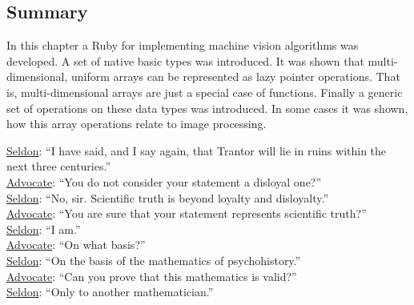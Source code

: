 \documentclass[12pt,a4paper,oneside,openright]{book}
\newcommand{\Ie}{That is, }
\newcommand{\removed}[1]{\cbstart\removedfragile{#1}\cbend{}}
\newcommand{\removedfragile}[1]{{\color{red}{\sout{#1}}}{}}
\newcommand{\added}[1]{\cbstart\addedfragile{#1}\cbend{}}
\newcommand{\addedfragile}[1]{{\color{green!50!black}{\uline{#1}}}{}}
\newcommand{\removed}[1]{}
\newcommand{\removedfragile}[1]{}
\newcommand{\added}[1]{#1}
\newcommand{\addedfragile}[1]{#1}
\newcommand{\changed}[2]{\removed{#1}\added{#2}}
\begin{document}
\begin{CJK}{UTF8}{}
\section{Summary}\label{cha:rubyvisionsum}
In this chapter a Ruby \changed{DSL}{library} for implementing machine vision algorithms was developed. A set of native basic types was introduced. It was shown that multi-dimensional, uniform arrays can be represented as lazy pointer operations. \Ie multi-dimensional arrays are just a special case of functions. Finally a generic set of operations on these data types was introduced. In some cases it was shown, how this array operations relate to image processing.

\begin{savequote}[8cm]
  \begin{singlespace}
    \underline{Seldon}: ``I have said, and I say again, that Trantor will lie in ruins within the next three centuries.''\\
    \underline{Advocate}: ``You do not consider your statement a disloyal one?''\\
    \underline{Seldon}: ``No, sir. Scientific truth is beyond loyalty and disloyalty.''\\
    \underline{Advocate}: ``You are sure that your statement represents scientific truth?''\\
    \underline{Seldon}: ``I am.''\\
    \underline{Advocate}: ``On what basis?''\\
    \underline{Seldon}: ``On the basis of the mathematics of psychohistory.''\\
    \underline{Advocate}: ``Can you prove that this mathematics is valid?''\\
    \underline{Seldon}: ``Only to another mathematician.''
  \end{singlespace}
\end{savequote}

\end{CJK}
\end{document}
